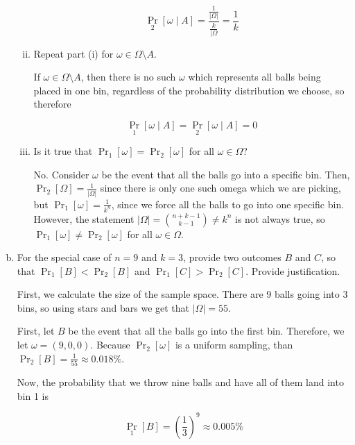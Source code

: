 \documentclass[11pt]{article}
\begin{document}
\begin{enumerate}[(a)]
\begin{enumerate}[(i)]
\begin{solution}
                \[ \Pr_2[\omega \mid A] = \frac{\frac{1}{|\Omega|}}{\frac{k}{|\Omega}} = \frac{1}{k}\] 
            \end{solution}
            \item Repeat part (i) for $\omega\in\Omega\setminus A$.
            
            \begin{solution}
                If $\omega \in \Omega \setminus A$, then there is no such $\omega$ which represents all balls being placed in one bin, regardless of the probability distribution we choose, so therefore 

                \[ \Pr_1[\omega \mid A] = \Pr_2[\omega \mid A] = 0\]
            \end{solution}
            \item Is it true that $\Pr_1[\omega] = \Pr_2[\omega]$ for all $\omega\in\Omega$?
            
            \begin{solution}
                No. Consider $\omega$ be the event that all the balls go into a specific bin. Then, $\Pr_2[\Omega] = \frac{1}{|\Omega|}$ since there is only one such omega which we are picking, but $\Pr_1[\omega] = \frac{1}{k^n}$, since we force all the balls to go into one specific bin. However, the statement $|\Omega| = {n + k - 1 \choose k - 1} \neq k^n$ is not always true, so $\Pr_1[\omega] \neq \Pr_2[\omega]$ for all $\omega \in \Omega$.
            \end{solution}
        \end{enumerate}

    \item For the special case of $n=9$ and $k=3$, provide two outcomes $B$ and $C$, so that $\Pr_1[B] < \Pr_2[B]$ and $\Pr_1[C] > \Pr_2[C]$. Provide justification.
    
    \begin{solution}
        First, we calculate the size of the sample space. There are 9 balls going into 3 bins, so using stars and bars we get that $|\Omega| = 55$. 

        First, let $B$ be the event that all the balls go into the first bin. Therefore, we let $\omega = (9, 0, 0)$. Because $\Pr_2[\omega]$ is a uniform sampling, than $\Pr_2[B] = \frac{1}{55} \approx 0.018\%$. 

        Now, the probability that we throw nine balls and have all of them land into bin 1 is 

        \[ \Pr_1[B] = \left(\frac{1}{3}\right)^9 \approx 0.005\%\]


\end{solution}
\end{enumerate}
\end{document}
